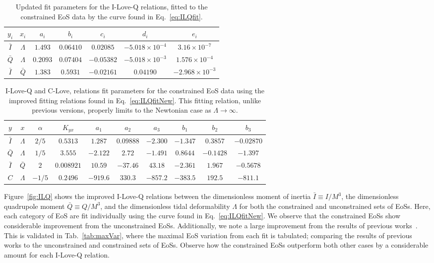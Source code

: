\documentclass[prd,twocolumn,nofootinbib,superscriptaddress,amsmath,amssymb]{revtex4-1}
\begin{document}
\begin{table*}
\centering
\caption{
Updated fit parameters for the I-Love-Q relations, fitted to the constrained EoS data by the curve found in Eq.~\ref{eq:ILQfit}.
}\label{tab:ILQfit}
\begin{tabular}{ c  c | c c c c c } 
 \hline
 \hline
 $y_i$ & $x_i$ & $a_i$ & $b_i$ & $c_i$ & $d_i$ & $e_i$ \\
 \hline
 $\bar{I}$ & $\Lambda$ & $1.493$ & $0.06410$ & $0.02085$ & $-5.018 \times 10^{-4}$ & $3.16 \times 10^{-7}$ \\
 $\bar{Q}$ & $\Lambda$ & $0.2093$ & $0.07404$ & $-0.05382$ & $-5.018 \times 10^{-3}$ & $1.576 \times 10^{-4}$ \\ 
  $\bar{I}$ & $\bar{Q}$ & $1.383$ & $0.5931$ & $-0.02161$ & $0.04190$ & $-2.968 \times 10^{-3}$ \\
 \hline
 \hline
\end{tabular}
\end{table*}

\begin{table*}
\centering
\caption{
I-Love-Q and C-Love, relations fit parameters for the constrained EoS data using the improved fitting relations found in Eq.~\ref{eq:ILQfitNew}.
This fitting relation, unlike previous versions, properly limits to the Newtonian case as $\Lambda \rightarrow \infty$.
}\label{tab:ILQfitNew}
\begin{tabular}{ c  c  | c c c c c c c c} 
 \hline
 \hline
 $y$ & $x$ & $\alpha$ & $K_{yx}$ & $a_1$ & $a_2$ & $a_3$ & $b_1$ & $b_2$ & $b_3$ \\
 \hline
 $\bar{I}$ & $\Lambda$ & $2/5$ & $0.5313$ & $1.287$ & $0.09888$ & $-2.300$ & $-1.347$ & $0.3857$ & $-0.02870$\\
 $\bar{Q}$ & $\Lambda$ & $1/5$ & $3.555$ & $-2.122$ & $2.72$ & $-1.491$ & $0.8644$ & $-0.1428$ & $-1.397$\\
 $\bar{I}$ & $\bar{Q}$ & $2$ & $0.008921$ & $10.59$ & $-37.46$ & $43.18$ & $-2.361$ & $1.967$ & $-0.5678$\\
 $C$ & $\Lambda$ & $-1/5$ & $0.2496$ & $-919.6$ & $330.3$ & $-857.2$ & $-383.5$ & $192.5$ & $-811.1$\\
\hline
\hline
\end{tabular}
\end{table*}

Figure~\ref{fig:ILQ} shows the improved I-Love-Q relations between the dimensionless moment of inertia $\bar{I} \equiv I/M^3$, the dimensionless quadrupole moment $\bar{Q} \equiv Q/M^3$, and the dimensionless tidal deformability $\Lambda$ for both the constrained and unconstrained sets of EoSs.
Here, each category of EoS are fit individually using the curve found in Eq.~\ref{eq:ILQfitNew}.
We observe that the constrained EoSs show considerable improvement from the unconstrained EoSs.
Additionally, we note a large improvement from the results of previous works~\cite{Yagi:ILQ}.
This is validated in Tab.~\ref{tab:maxVar}, where the maximal EoS variation from each fit is tabulated; comparing the results of previous works to the unconstrained and constrained sets of EoSs.
Observe how the constrained EoSs outperform both other cases by a considerable amount for each I-Love-Q relation.
\end{document}
